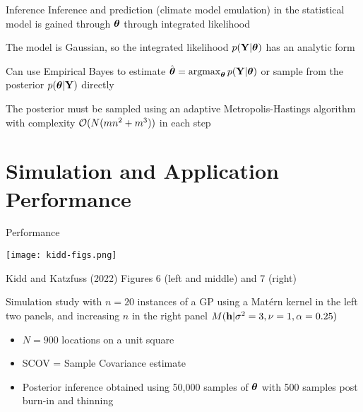\documentclass[letterpaper, 10pt, compress]{beamer}
\begin{document}
\begin{frame}{Inference}
    Inference and prediction (climate model emulation) in the statistical model
    is gained through $\boldsymbol{\theta}$ through integrated likelihood
    \medskip\par

    The model is Gaussian, so the integrated likelihood $p(\mathbf{Y} | \boldsymbol{\theta})$ has
    an analytic form
    \medskip\par

    Can use Empirical Bayes to estimate $\hat{\boldsymbol{\theta}} = \operatorname{argmax}_{\boldsymbol{\theta}} p(\mathbf{Y} | \boldsymbol{\theta})$
    or sample from the posterior $p(\boldsymbol{\theta} | \mathbf{Y})$ directly
    \medskip\par

    The posterior must be sampled using an adaptive Metropolis-Hastings algorithm
    with complexity $\mathcal{O}(N(mn^2 + m^3))$ in each step
\end{frame}


\section[Performance]{Simulation and Application Performance}

\begin{frame}{Performance}
    \begin{center}
        \texttt{[image: kidd-figs.png]}
    \end{center}
    Kidd and Katzfuss (2022) Figures 6 (left and middle) and 7 (right) \cite{kidd-katzfuss2021}
    \medskip\par

    Simulation study with $n = 20$ instances of a GP using a Mat\'{e}rn kernel in the
    left two panels, and increasing $n$ in the right panel
    $M(\mathbf{h} | \sigma^2 = 3, \nu = 1, \alpha = 0.25)$
    \begin{itemize}
        \item $N = 900$ locations on a unit square
        \item SCOV = Sample Covariance estimate
        \item Posterior inference obtained using 50,000 samples of $\boldsymbol{\theta}$ with
        500 samples post burn-in and thinning
    \end{itemize}
\end{frame}
\end{document}
